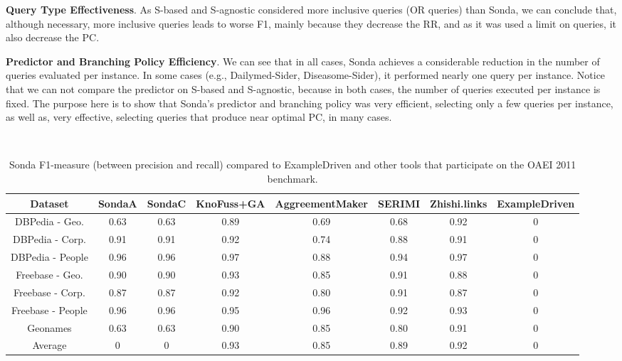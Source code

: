 \textbf{Query Type Effectiveness}. As S-based and S-agnostic considered more inclusive queries (OR queries) than Sonda, we can conclude that, although necessary, more inclusive queries leads to worse F1, mainly because they decrease the RR, and as it was used a limit on queries, it also decrease the PC. 

\textbf{Predictor and Branching Policy Efficiency}. We can see that in all cases, Sonda achieves a considerable reduction in the number of queries evaluated per instance. In some cases (e.g., Dailymed-Sider, Diseasome-Sider), it performed nearly one query per instance. Notice that we can not compare the predictor on S-based and S-agnostic, because in both cases, the number of queries executed per instance is fixed. The purpose here is to show  that Sonda's predictor and branching policy was very efficient, selecting only a few queries per instance, as well as, very effective, selecting queries that produce near optimal PC, in many cases. 


\begin{center}
\begin{table*}[h]
\centering
\scriptsize\tt
\caption{Sonda F1-measure (between precision and recall) compared to ExampleDriven and other tools that participate on the OAEI 2011 benchmark.} 
\begin{tabular}{|c|c|c|c|c|c|c|c|}
\hline
Dataset  &  SondaA  &  SondaC & KnoFuss+GA & AggreementMaker & SERIMI & Zhishi.links & ExampleDriven\\ \hline
DBPedia - Geo. & 0.63 & 0.63  & 0.89 & 0.69 & 0.68 & 0.92 & 0 \\ \hline
DBPedia - Corp. & 0.91 & 0.91 & 0.92 & 0.74 & 0.88 & 0.91 & 0\\ \hline
DBPedia - People & 0.96 & 0.96 & 0.97 & 0.88 & 0.94 & 0.97 & 0\\ \hline
Freebase - Geo. & 0.90 & 0.90 & 0.93 & 0.85 & 0.91 & 0.88 & 0\\ \hline
Freebase - Corp. & 0.87 & 0.87 & 0.92 & 0.80 & 0.91 & 0.87 & 0\\ \hline
Freebase - People & 0.96 &  0.96 & 0.95 & 0.96 & 0.92 & 0.93 & 0\\ \hline
Geonames & 0.63 & 0.63  & 0.90 & 0.85 & 0.80 & 0.91 & 0\\ \hline
Average & 0 & 0  & 0.93 & 0.85 & 0.89 &  0.92 & 0\\ \hline											 
\end{tabular}  
\end{table*} 
\end{center}

